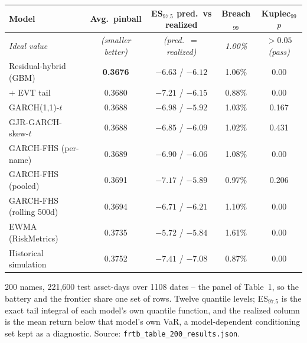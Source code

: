 \begin{tabular}{lcccc}
\toprule
Model & Avg.\ pinball & ES$_{97.5}$ pred.\ vs realized & Breach$_{99}$ & Kupiec$_{99}$ $p$ \\
\midrule
\emph{Ideal value} & \emph{(smaller better)} & \emph{(pred.\ $=$ realized)} & \emph{1.00\%} & \emph{$>0.05$ (pass)} \\
\midrule
Residual-hybrid (GBM) & \textbf{0.3676} & $-6.63$ / $-6.12$ & 1.06\% & 0.00 \\
\quad $+$ EVT tail & 0.3680 & $-7.21$ / $-6.15$ & 0.88\% & 0.00 \\
GARCH(1,1)-$t$ & 0.3688 & $-6.98$ / $-5.92$ & 1.03\% & 0.167 \\
GJR-GARCH-skew-$t$ & 0.3688 & $-6.85$ / $-6.09$ & 1.02\% & 0.431 \\
GARCH-FHS (per-name) & 0.3689 & $-6.90$ / $-6.06$ & 1.08\% & 0.00 \\
GARCH-FHS (pooled) & 0.3691 & $-7.17$ / $-5.89$ & 0.97\% & 0.206 \\
GARCH-FHS (rolling 500d) & 0.3694 & $-6.71$ / $-6.21$ & 1.10\% & 0.00 \\
EWMA (RiskMetrics) & 0.3735 & $-5.72$ / $-5.84$ & 1.61\% & 0.00 \\
Historical simulation & 0.3752 & $-7.41$ / $-7.08$ & 0.87\% & 0.00 \\
\bottomrule
\end{tabular}
\begin{tablenotes}\footnotesize
\item 200 names, 221,600 test asset-days over 1108 dates -- the panel of Table~1, so the battery and the frontier share one set of rows. Twelve quantile levels; ES$_{97.5}$ is the exact tail integral of each model's own quantile function, and the realized column is the mean return below that model's own VaR, a model-dependent conditioning set kept as a diagnostic. Source: \texttt{frtb\_table\_200\_results.json}.
\end{tablenotes}
